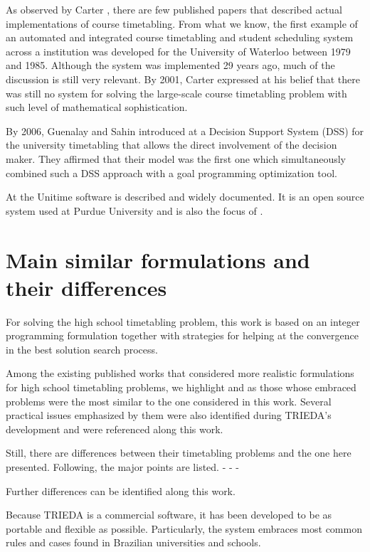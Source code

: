 As observed by Carter \cite{Carter2001}, there are few published papers that described actual implementations of course timetabling. From what we know, the first example of an automated and integrated course timetabling and student scheduling system across a institution was developed for the University of Waterloo between 1979 and 1985. Although the system was implemented 29 years ago, much of the discussion is still very relevant. By 2001, Carter expressed at \cite{Carter2001} his belief that there was still no system for solving the large-scale course timetabling problem with such level of mathematical sophistication.

By 2006, Guenalay and Sahin introduced at \cite{Guenalay2006} a Decision Support System (DSS) for the university timetabling that allows the direct involvement of the decision maker. They affirmed that their model was the first one which simultaneously combined such a DSS approach with a goal programming optimization tool.

At \cite{Unitime} the Unitime software is described and widely documented. It is an open source system used at Purdue University and is also the focus of \cite{Murray2007}.


\section{Main similar formulations and their differences}

For solving the high school timetabling problem, this work is based on an integer programming formulation together with strategies for helping at the convergence in the best solution search process.

Among the existing published works that considered more realistic formulations for high school timetabling problems, we highlight \cite{Birbas2009} and \cite{Birbas2009} as those whose embraced problems were the most similar to the one considered in this work. Several practical issues emphasized by them were also identified during TRIEDA's development and were referenced along this work.

Still, there are differences between their timetabling problems and the one here presented. Following, the major points are listed.
-
-
-

Further differences can be identified along this work.

Because TRIEDA is a commercial software, it has been developed to be as portable and flexible as possible. Particularly, the system embraces most common rules and cases found in Brazilian universities and schools.


